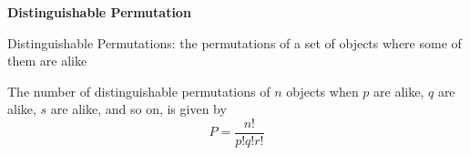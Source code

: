 \begin{center}
\textbf{Distinguishable Permutation
}
\end{center}

\vspace*{1ex}

Distinguishable Permutations: the permutations of a set of objects where some of them are alike

\vspce 

The number of distinguishable permutations of $n$ objects when $p$ are alike, $q$ are alike, $s $ are alike, and so on, is given by 
\[
P= \displaystyle \frac{n!}{p!q!r! } 
\]
